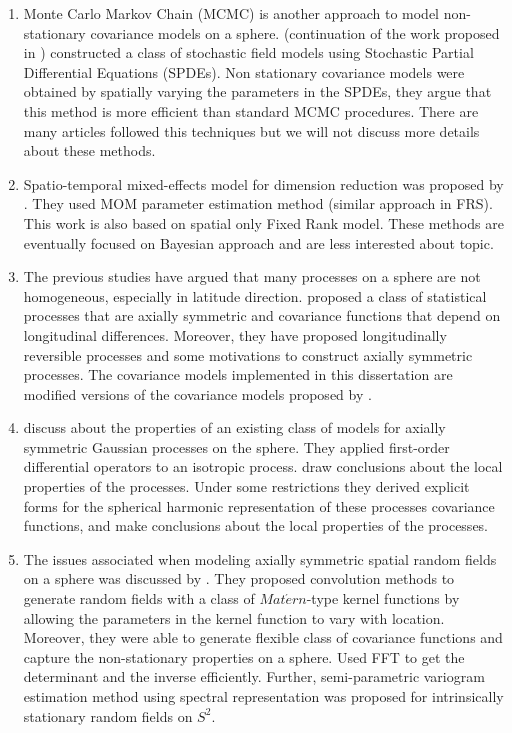 \begin{enumerate}
\item Monte Carlo Markov Chain (MCMC) is another approach to model non-stationary covariance models on a sphere. \cite{BolinLindgren2011} (continuation of the work proposed in \cite{Lindgren2011} ) constructed a class of stochastic field models using Stochastic Partial Differential Equations (SPDEs). Non stationary covariance models were obtained by spatially varying the parameters in the SPDEs, they argue that this method is more efficient than standard MCMC procedures. There are many articles followed this techniques but we will not discuss more details about these methods.

\item Spatio-temporal mixed-effects model for dimension reduction was proposed by \cite{KatzfussCressie2011}. They used MOM parameter estimation method (similar approach in FRS). This work is also based on \cite{CressieJohannesson2008} spatial only Fixed Rank model. These methods are eventually focused on Bayesian approach and are less interested about topic.

\item The previous studies have argued that many processes on a sphere are not homogeneous, especially in latitude direction. \cite{Huang2012} proposed a class of statistical processes that are axially symmetric and covariance functions that depend on longitudinal differences. Moreover, they have proposed longitudinally reversible processes and some motivations to construct axially symmetric processes. The covariance models implemented in this dissertation are modified versions of the covariance models proposed by \cite{Huang2012}.  

\item \cite{HitczenkoStein2012} discuss about the properties of an existing class of models for axially symmetric Gaussian processes on the sphere. They applied first-order differential operators to an isotropic process. draw conclusions about the local properties of the processes. Under some restrictions they derived explicit forms for the spherical harmonic representation of these processes covariance functions, and make conclusions about the local properties of the processes.

\item The issues associated when modeling axially symmetric spatial random fields on a sphere was discussed by \cite{Li2013}. They proposed convolution methods to generate random fields with a class of $Mat\acute{e}rn$-type kernel functions by allowing the parameters in the kernel function to vary with location. Moreover, they were able to generate flexible class of covariance functions and capture the non-stationary properties on a sphere. Used FFT to get the determinant and the inverse efficiently. Further, semi-parametric variogram estimation method using spectral representation was proposed for intrinsically stationary random fields on $S^2$.     


\end{enumerate}
